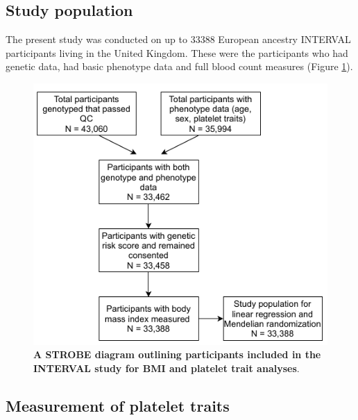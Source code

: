 \documentclass[11pt,twoside]{bristolthesis}
\begin{document}
\hypertarget{study-population}{%
\subsection{Study population}\label{study-population}}

The present study was conducted on up to 33388 European ancestry INTERVAL participants living in the United Kingdom. These were the participants who had genetic data, had basic phenotype data and full blood count measures (Figure \ref{fig:INTERVAL-STROBE}).




\begin{figure}

{\centering \includegraphics[width=0.6\linewidth]{figure/BMI_platelets/STROBE_diagram} 

}

\caption[A STROBE diagram outlining participants included in the INTERVAL study for BMI and platelet trait analyses.]{\textbf{A STROBE diagram outlining participants included in the INTERVAL study for BMI and platelet trait analyses}.}\label{fig:INTERVAL-STROBE}
\end{figure}
\hypertarget{measurement-of-platelet-traits}{%
\subsection{Measurement of platelet traits}\label{measurement-of-platelet-traits}}
\end{document}
